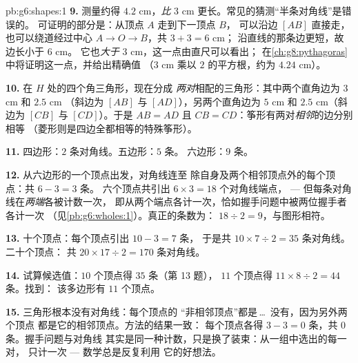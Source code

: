 \begin{solution}{pb:g6:shapes:1}
\textbf{9.} 测量约得 $4.2$ cm，\emph{比}
$3$ cm 更长。常见的猜测“半条对角线”是错误的。
可证明的部分是：从顶点 $A$ 走到下一顶点 $B$，
可以沿边 $[AB]$ 直接走，也可以绕道经过中心
$A \to O \to B$，共 $3 + 3 = 6$ cm；
沿直线的那条边更短，故边长小于 $6$ cm。
它也\emph{大于} $3$ cm，这一点由直尺可以看出；
在\cref{ch:g8:pythagoras}中将证明这一点，并给出精确值
（$3$ cm 乘以 $2$ 的平方根，约为 $4.24$ cm）。

\textbf{10.} 在 $H$ 处的四个角三角形，现在分成
\emph{两对}相配的三角形：其中两个直角边为 $3$ cm 和 $2.5$ cm
（斜边为 $[AB]$ 与 $[AD]$），另两个直角边为 $5$ cm 和
$2.5$ cm（斜边为 $[CB]$ 与 $[CD]$）。于是 $AB = AD$ 且
$CB = CD$：筝形有两对\emph{相邻}的边分别相等
（菱形则是四边全都相等的特殊筝形）。

\textbf{11.} 四边形：$2$ 条对角线。五边形：$5$ 条。
六边形：$9$ 条。

\textbf{12.} 从六边形的一个顶点出发，对角线连至
除自身及两个相邻顶点外的每个顶点：共 $6 - 3 = 3$ 条。
六个顶点共引出 $6 \times 3 = 18$ 个对角线端点，
--- 但每条对角线在\emph{两端}各被计数一次，
即从两个端点各计一次，恰如握手问题中被两位握手者各计一次
（见\cref{pb:g6:wholes:1}）。真正的条数为：
$18 \div 2 = 9$，与图形相符。

\textbf{13.} 十个顶点：每个顶点引出 $10 - 3 = 7$ 条，
于是共 $10 \times 7 \div 2 = 35$ 条对角线。二十个顶点：
共 $20 \times 17 \div 2 = 170$ 条对角线。

\textbf{14.} 试算候选值：$10$ 个顶点得 $35$ 条（第 13 题），
$11$ 个顶点得 $11 \times 8 \div 2 = 44$ 条。找到：
该多边形有 $11$ 个顶点。

\textbf{15.} 三角形根本没有对角线：每个顶点的
“非相邻顶点”都是\,\dots\ 没有，因为另外两个顶点
都是它的相邻顶点。方法的结果一致：
每个顶点各得 $3 - 3 = 0$ 条，共 $0$ 条。握手问题与对角线
其实是同一种计数，只是换了装束：从一组中选出的每一对，
只计一次 --- 数学总是反复利用
它的好想法。
\end{solution}
